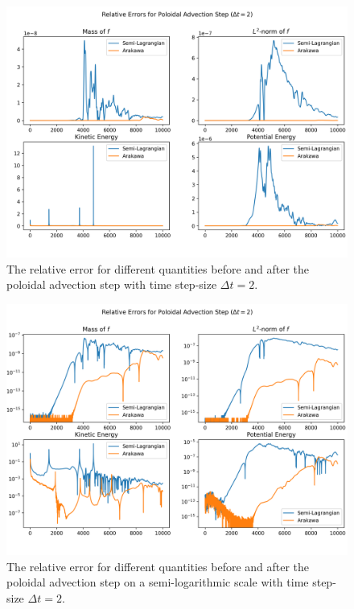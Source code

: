 \begin{figure}
	\centering
	\includegraphics[width=0.9\linewidth]{plots/rel_err dt2}
	\caption{The relative error for different quantities before and after the poloidal advection step with time step-size $\Delta t = 2$.}
	\label{fig:relerr_dt2}
\end{figure}


\begin{figure}
	\centering
	\includegraphics[width=0.9\linewidth]{plots/rel_err_log dt2}
	\caption{The relative error for different quantities before and after the poloidal advection step on a semi-logarithmic scale with time step-size $\Delta t = 2$.}
	\label{fig:relerrlog_dt2}
\end{figure}


